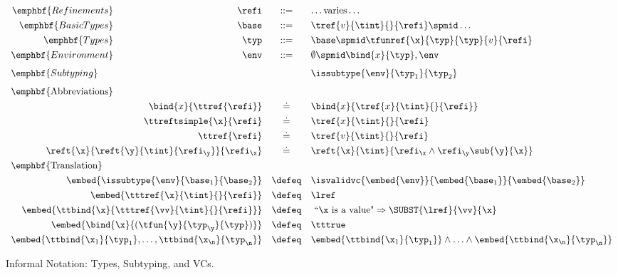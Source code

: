\begin{figure}[!t]
\centering
\captionsetup{justification=centering}
$$
\begin{array}{rrcl}
\emphbf{Refinements} & \refi     & ::= & \dots \text{varies} \dots \\[0.05in] 
\emphbf{Basic Types} & \base  & ::= & \tref{v}{\tint}{}{\refi} \spmid \dots \\[0.05in] 
\emphbf{Types}       & \typ   & ::= & \base \spmid \tfunref{\x}{\typ}{\typ}{v}{\refi} \\[0.05in] 
\emphbf{Environment} & \env   & ::= & \emptyset \spmid \bind{x}{\typ}, \env \\[0.1in]

\multicolumn{3}{l}{\emphbf{Subtyping}}   & \issubtype{\env}{\typ_1}{\typ_2} \\[0.1in]

\multicolumn{4}{l}{\mbox{\emphbf{Abbreviations}}} \\[0.05in]
  \multicolumn{2}{r}{\bind{x}{\ttref{\refi}}} & \doteq & \bind{x}{\tref{x}{\tint}{}{\refi}} \\[0.05in]
  \multicolumn{2}{r}{\ttreftsimple{\x}{\refi}}   & \doteq & {\tref{x}{\tint}{}{\refi}} \\[0.05in]
  \multicolumn{2}{r}{\ttref{\refi}}             & \doteq & {\tref{v}{\tint}{}{\refi}} \\[0.05in]
  \multicolumn{2}{r}{\reft{\x}{\reft{\y}{\tint}{\refi_\y}}{\refi_\x}} & \doteq & 
  					{\reft{\x}{\tint}{\refi_\x \land \refi_\y\sub{\y}{\x}}} \\[0.05in]


\multicolumn{4}{l}{\mbox{\emphbf{Translation}}} \\[0.05in]
\multicolumn{2}{r}{\embed{\issubtype{\env}{\base_1}{\base_2}}} & \defeq& \isvalidvc{\embed{\env}}{\embed{\base_1}}{\embed{\base_2}}\\[0.05in]
  \multicolumn{2}{r}{\embed{\tttref{\x}{\tint}{}{\refi}}} & \defeq & \lref\\[0.05in]
  \multicolumn{2}{r}{\embed{\ttbind{\x}{\tttref{\vv}{\tint}{}{\refi}}}} &\defeq & \ \mbox{``$\mathtt{\x}$ is a value"}  \Rightarrow \SUBST{\lref}{\vv}{\x}\\[0.05in]
  \multicolumn{2}{r}{\embed{\bind{\x}{(\tfun{\y}{\typ_\y}{\typ})}}} &\defeq & \tttrue\\[0.05in]
  \multicolumn{2}{r}{\embed{\ttbind{\x_1}{\typ_1},\ldots,\ttbind{\x_\n}{\typ_\n}}} & \defeq & \embed{\ttbind{\x_1}{\typ_1}} \wedge \ldots \wedge \embed{\ttbind{\x_\n}{\typ_\n}} \\
\end{array}
$$
\caption[Summary of Informal Notation.]{Informal Notation: Types, Subtyping, and VCs.}
\label{fig:overview:syntax}
\end{figure}


